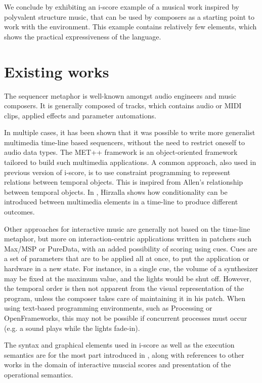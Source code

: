\documentclass{article}
\begin{document}
We conclude by exhibiting an i-score example of a musical work inspired by polyvalent structure music,
that can be used by composers as a starting point to work with the environment. 
This example contains relatively few elements, which shows the practical expressiveness of the language.

\section{Existing works}
The sequencer metaphor is well-known amongst audio engineers and music composers. 
It is generally composed of tracks, which contains audio or MIDI clips, applied effects 
and parameter automations.

In multiple cases, it has been shown that it was possible to write 
more generalist multimedia time-line based sequencers, without the need to restrict oneself 
to audio data types. 
The MET++ framework\cite{ackermann1994direct} is an object-oriented framework 
tailored to build such multimedia applications.
A common approach, also used in previous version of i-score, is to use constraint programming 
to represent relations between temporal objects\cite{song1999interactive, allombert2006concurrent, toro2010concurrent}. 
This is inspired from Allen's relationship between temporal objects.
In \cite{hirzalla1995temporal}, Hirzalla shows how conditionality can be introduced between multimedia elements in a time-line to produce different outcomes.

Other approaches for interactive music are generally not based on the time-line metaphor, 
but more on interaction-centric applications written in patchers such Max/MSP or PureData, 
with an added possibility of scoring using cues. 
Cues are a set of parameters that are to be applied all at once, to put the application or hardware in a new state.
For instance, in a single cue, the volume of a synthesizer may be fixed at the maximum value, and the lights would be shut off.
However, the temporal order is then not apparent from the visual representation of the program, 
unless the composer takes care of maintaining it in his patch.
When using text-based programming environments, such as Processing or OpenFrameworks, this may not be possible if concurrent processes must occur (e.g. a sound plays while the lights fade-in).

The syntax and graphical elements used in i-score as well as the 
execution semantics are for the most part introduced in \cite{celerier2015ossia, baltazar2014score}, along 
with references to other works in the domain of interactive muscial scores and presentation of the operational semantics.
\end{document}
